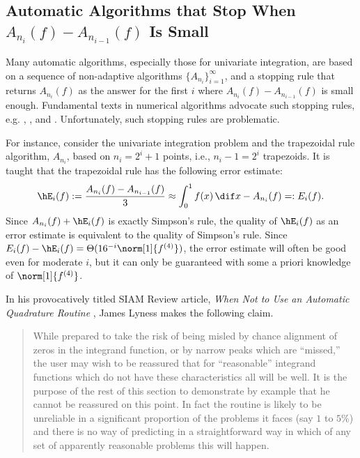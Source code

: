 \documentclass[]{elsarticle}
\theoremstyle{definition}
\theoremstyle{remark}
\begin{document}
\subsection{Automatic Algorithms that Stop When $A_{n_{i}}(f)-A_{n_{i-1}}(f)$ Is Small}

Many automatic algorithms, especially those for univariate integration, are based on a sequence of non-adaptive algorithms $\{A_{n_i}\}_{i=1}^{\infty}$, and a stopping rule that returns $A_{n_{i}}(f)$ as the answer for the first $i$ where $A_{n_{i}}(f)-A_{n_{i-1}}(f)$ is small enough.  Fundamental texts in numerical algorithms advocate such stopping rules, e.g. \cite[p.\ 223--224]{BurFai10}, \cite[p.\ 233]{CheKin12a}, and \cite[p.\ 270]{Sau12a}.  Unfortunately, such stopping rules are problematic.

For instance, consider the univariate integration problem and the trapezoidal rule algorithm, $A_{n_i}$, based on $n_i=2^i+1$ points, i.e., $n_i-1=2^i$ trapezoids.  It is taught that the trapezoidal rule has the following error estimate:
\[
\hE_i(f):=\frac{A_{n_{i}}(f)-A_{n_{i-1}}(f)}{3} \approx \int_0^1 f(x) \, \dif x - A_{n_i}(f) =:E_i(f).
\]
Since $A_{n_i}(f)+ \hE_i(f)$ is exactly Simpson's rule, the quality of $\hE_i(f)$ as an error estimate is equivalent to the quality of Simpson's rule. Since $E_i(f) -\hE_i(f) = \Theta(16^{-i} \norm[1]{f^{(4)}})$, the error estimate will often be good even for moderate $i$, but it can only be guaranteed with some a priori knowledge of $\norm[1]{f^{(4)}}$.

In his provocatively titled SIAM Review article, \emph{When Not to Use an Automatic Quadrature Routine} \cite[p.\ 69]{Lyn83}, James Lyness makes the following claim.
\begin{quote}
While prepared to take the risk of being misled by chance alignment of zeros in the integrand function, or by narrow peaks which are ``missed,'' the user may wish to be reassured that for ``reasonable'' integrand functions which do not have these characteristics all will be well. It is the purpose of the rest of this section to demonstrate by example that he cannot be reassured on this point. In fact the routine is likely to be unreliable in a significant proportion of the problems it faces (say $1$ to $5\%$) and there is no way of predicting in a straightforward way in which of any set of apparently reasonable problems this will happen.
\end{quote}
\end{document}
